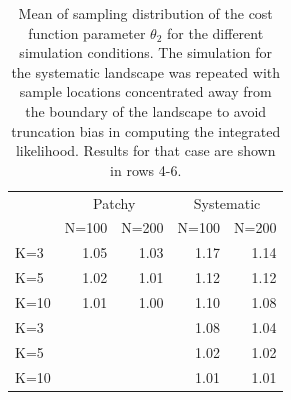 \documentclass[12pt]{article}
\begin{document}
\begin{spacing}{1.2}
\begin{table}[ht]
\centering
\caption{
Mean of sampling distribution of the cost function parameter
$\theta_{2}$ for the different simulation
conditions.  The simulation for the systematic landscape was repeated
with sample locations concentrated away from the boundary of the
landscape to avoid truncation bias in computing the integrated
likelihood. Results for that case are shown in rows 4-6.
}
\begin{tabular}{l|rrrr}
 & \multicolumn{2}{c}{Patchy} & \multicolumn{2}{c}{Systematic} \\
    & N=100 &  N=200  &   N=100 &  N=200  \\ \hline
K=3 &   1.05&    1.03 &     1.17 & 1.14 \\
K=5 &   1.02&    1.01 &     1.12 &1.12 \\
K=10&   1.01&    1.00 &     1.10 &1.08 \\ \hline
K=3    &       &         &     1.08 & 1.04 \\
K=5    &       &         &     1.02 & 1.02 \\
K=10    &       &         &     1.01 & 1.01 \\
\end{tabular}
\label{tab.results2}
\end{table}










\end{spacing}
\end{document}
